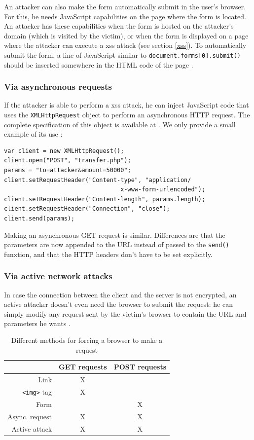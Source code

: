 An attacker can also make the form automatically submit in the user's browser. For this, he needs JavaScript capabilities on the page where the form is located. An attacker has these capabilities when the form is hosted on the attacker's domain (which is visited by the victim), or when the form is displayed on a page where the attacker can execute a \gls{xss} attack (see section \ref{xss}). To automatically submit the form, a line of JavaScript similar to \texttt{document.forms[0].submit()} should be inserted somewhere in the HTML code of the page \cite{Jovanovic2006}.

\subsubsection{Via asynchronous requests}

If the attacker is able to perform a \gls{xss} attack, he can inject JavaScript code that uses the \texttt{XMLHttpRequest} object to perform an asynchronous HTTP request. The complete specification of this object is available at \cite{Kesteren:09:X}. We only provide a small example of its use \cite{Binny2010}:
\begin{lstlisting}
var client = new XMLHttpRequest();
client.open("POST", "transfer.php");
params = "to=attacker&amount=50000";
client.setRequestHeader("Content-type", "application/
                                 x-www-form-urlencoded");
client.setRequestHeader("Content-length", params.length);
client.setRequestHeader("Connection", "close");
client.send(params);
\end{lstlisting}
Making an asynchronous GET request is similar. Differences are that the parameters are now appended to the URL instead of passed to the \texttt{send()} funxtion, and that the HTTP headers don't have to be set explicitly.

\subsubsection{Via active network attacks}

In case the connection between the client and the server is not encrypted, an active attacker doesn't even need the browser to submit the request: he can simply modify any request sent by the victim's browser to contain the URL and parameters he wants \cite{Barth2008}.

\begin{table}[ht]
	\centering
	\begin{tabular}{r|cc}
		& GET requests & POST requests\\
		\hline
		Link & X & \\
		\texttt{<img>} tag & X & \\
		Form &  & X \\
		Async. request & X & X \\
		Active attack & X & X \\
	\end{tabular}
	\caption{Different methods for forcing a browser to make a request}
	\label{tab:forcing-request}
\end{table}

